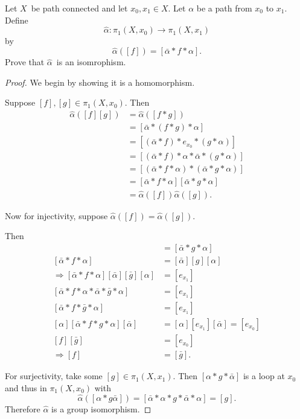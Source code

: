 \documentclass[11pt]{article}
\begin{document}
\begin{prob}
    Let $X$ be path connected and let $x_0, x_1 \in X$. Let 
    $\alpha$ be a path from $x_0$ to $x_1$. Define 
    \[
        \widehat \alpha : \pi_1(X,x_0) \to \pi_1(X,x_1)
    \]
    by 
    \[
        \widehat \alpha([f]) = [\bar \alpha * f * 
        \alpha].
    \]
    Prove that $\widehat \alpha$ is an isomrophism.
\end{prob}
\begin{proof}
    We begin by showing it is a homomorphism. 

    Suppose $[f],[g] \in \pi_1(X,x_0)$. 
    Then 
    \begin{align*}
        \widehat \alpha([f][g]) 
        &= \widehat \alpha([f * g]) \\  
        &= [\bar \alpha * (f * g) * 
        \alpha] \\ 
        &= [(\bar \alpha * f) * e_{x_0} * (g * \alpha)] \\ 
        &= [(\bar \alpha * f) * \alpha * \bar \alpha * 
        (g * \alpha)] \\ 
        &= [(\bar \alpha * f * \alpha) * (\bar \alpha * g 
        * \alpha)] \\ 
        &= [\bar \alpha * f * \alpha][\bar \alpha * g * \alpha] \\ 
        &= \widehat \alpha([f])\widehat \alpha([g]). 
    \end{align*}

    Now for injectivity, suppose 
    $\widehat \alpha([f]) = \widehat \alpha([g])$. 

    Then 
    \begin{align*}
        [\bar \alpha * 
        f * \alpha] &= [\bar \alpha * g * \alpha] \\ 
        [\bar \alpha * f * \alpha] 
                    &= [\bar \alpha][g][\alpha] \\
        \Rightarrow [\bar \alpha * f * \alpha][\bar \alpha]
        [\bar g][\alpha] &= [e_{x_1}] \\ 
        [\bar \alpha * f * \alpha *
        \bar \alpha * \bar g * \alpha] 
                         &= [e_{x_1}] \\ 
        [\bar \alpha * f * \bar g * \alpha] 
                         &= [e_{x_1}] \\ 
        [\alpha][\bar \alpha * f * g * \alpha]
        [\bar \alpha] 
                         &= [\alpha][e_{x_1}][\bar \alpha] 
                         = [e_{x_0}] \\ 
        [f] [\bar g] &= [e_{x_0}] \\ 
        \Rightarrow [f] &= [\bar g]. 
    \end{align*}

    For surjectivity, take some 
    $[g] \in \pi_1(X, x_1)$.
    Then $[\alpha * g * \bar \alpha]$ 
    is a loop at $x_0$ and thus in $\pi_1(X,x_0)$ 
    with 
    \[
        \widehat \alpha([\alpha * g \bar \alpha])
        = [\bar \alpha * \alpha * g * \bar \alpha * \alpha] 
        = [g]. 
    \]
    Therefore $\widehat \alpha$ is a group isomorphism. 
\end{proof}
\end{document}
